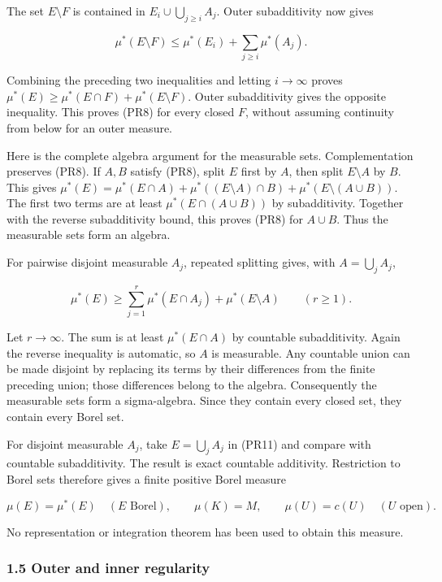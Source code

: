 \documentclass[
  11pt,
]{article}
\begin{document}
The set \(E\setminus F\) is contained in
\(E_i\cup\bigcup_{j\geq i}A_j\). Outer subadditivity now gives

\[
\mu^*(E\setminus F)
\leq\mu^*(E_i)+\sum_{j\geq i}\mu^*(A_j).
\tag{PR10}
\]

Combining the preceding two inequalities and letting \(i\to\infty\)
proves \(\mu^*(E)\geq\mu^*(E\cap F)+\mu^*(E\setminus F)\). Outer
subadditivity gives the opposite inequality. This proves (PR8) for every
closed \(F\), without assuming continuity from below for an outer
measure.

Here is the complete algebra argument for the measurable sets.
Complementation preserves (PR8). If \(A,B\) satisfy (PR8), split \(E\)
first by \(A\), then split \(E\setminus A\) by \(B\). This gives
\(\mu^*(E)=\mu^*(E\cap A)+\mu^*((E\setminus A)\cap B)+\mu^*(E\setminus(A\cup B))\).
The first two terms are at least \(\mu^*(E\cap(A\cup B))\) by
subadditivity. Together with the reverse subadditivity bound, this
proves (PR8) for \(A\cup B\). Thus the measurable sets form an algebra.

For pairwise disjoint measurable \(A_j\), repeated splitting gives, with
\(A=\bigcup_jA_j\),

\[
\mu^*(E)\geq\sum_{j=1}^r\mu^*(E\cap A_j)+\mu^*(E\setminus A)
\qquad(r\geq1).
\tag{PR11}
\]

Let \(r\to\infty\). The sum is at least \(\mu^*(E\cap A)\) by countable
subadditivity. Again the reverse inequality is automatic, so \(A\) is
measurable. Any countable union can be made disjoint by replacing its
terms by their differences from the finite preceding union; those
differences belong to the algebra. Consequently the measurable sets form
a sigma-algebra. Since they contain every closed set, they contain every
Borel set.

For disjoint measurable \(A_j\), take \(E=\bigcup_jA_j\) in (PR11) and
compare with countable subadditivity. The result is exact countable
additivity. Restriction to Borel sets therefore gives a finite positive
Borel measure

\[
\mu(E)=\mu^*(E)\quad(E\text{ Borel}),\qquad
\mu(K)=M,\qquad \mu(U)=c(U)\quad(U\text{ open}).
\tag{PR12}
\]

No representation or integration theorem has been used to obtain this
measure.

\subsubsection{1.5 Outer and inner
regularity}\label{outer-and-inner-regularity}
\end{document}
